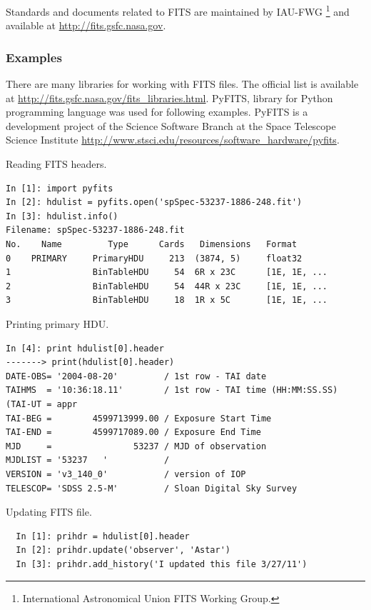 Standards and documents related to FITS are maintained by IAU-FWG
\footnote{International Astronomical Union FITS Working Group.} and
available at \url{http://fits.gsfc.nasa.gov}.

\subsubsection*{Examples}

There are many libraries for working with FITS files. The official
list is available at
\url{http://fits.gsfc.nasa.gov/fits_libraries.html}. PyFITS, library
for Python programming language was used for following
examples. PyFITS is a development project of the Science Software
Branch at the Space Telescope Science Institute
\url{http://www.stsci.edu/resources/software_hardware/pyfits}.


Reading FITS headers.

\begin{lstlisting}
In [1]: import pyfits
In [2]: hdulist = pyfits.open('spSpec-53237-1886-248.fit')
In [3]: hdulist.info()
Filename: spSpec-53237-1886-248.fit
No.    Name         Type      Cards   Dimensions   Format
0    PRIMARY     PrimaryHDU     213  (3874, 5)     float32
1                BinTableHDU     54  6R x 23C      [1E, 1E, ...
2                BinTableHDU     54  44R x 23C     [1E, 1E, ...
3                BinTableHDU     18  1R x 5C       [1E, 1E, ...
\end{lstlisting}

\noindent Printing primary HDU.

\begin{lstlisting}
In [4]: print hdulist[0].header
-------> print(hdulist[0].header)
DATE-OBS= '2004-08-20'         / 1st row - TAI date                             
TAIHMS  = '10:36:18.11'        / 1st row - TAI time (HH:MM:SS.SS) (TAI-UT = appr
TAI-BEG =        4599713999.00 / Exposure Start Time                            
TAI-END =        4599717089.00 / Exposure End Time                              
MJD     =                53237 / MJD of observation                             
MJDLIST = '53237   '           /                                                
VERSION = 'v3_140_0'           / version of IOP                                 
TELESCOP= 'SDSS 2.5-M'         / Sloan Digital Sky Survey
\end{lstlisting}

Updating FITS file.

\begin{lstlisting}
  In [1]: prihdr = hdulist[0].header
  In [2]: prihdr.update('observer', 'Astar')
  In [3]: prihdr.add_history('I updated this file 3/27/11')
\end{lstlisting}

